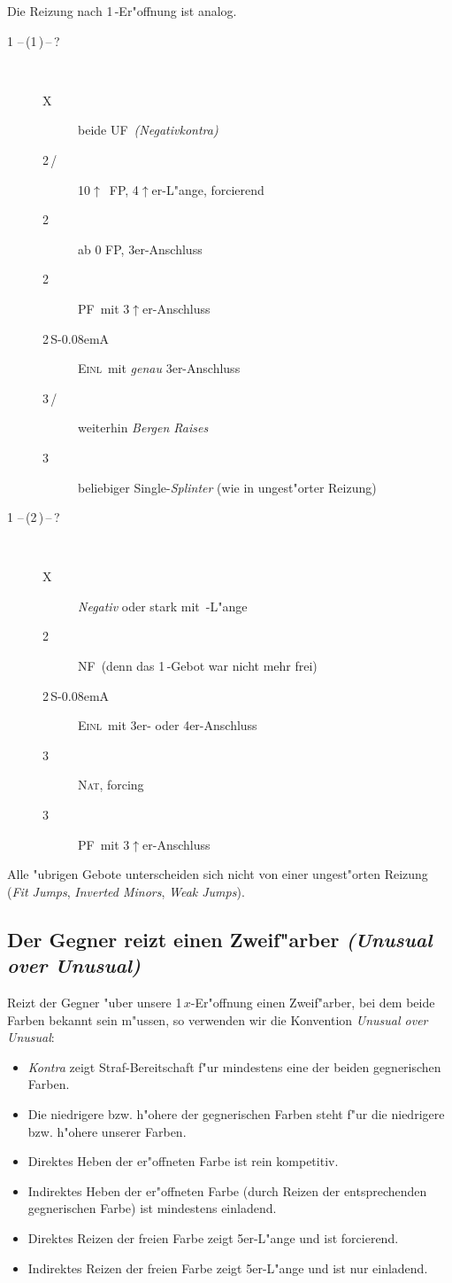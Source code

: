 \documentclass[11pt,german,twocolumn]{scrartcl}
\renewcommand{\Cl}{{\color{ClColor}{$\clubsuit$}}}
\renewcommand{\Di}{{\color{DiColor}{$\vardiamondsuit$}}}
\renewcommand{\He}{{\color{HeColor}{$\varheartsuit$}}}
\renewcommand{\Sp}{{\color{SpColor}{$\spadesuit$}}}
\def\pik{\,\Sp}
\def\coe{\,\He}
\def\kar{\,\Di}
\def\tre{\,\Cl}
\def\ka{\Di}
\def\pl{$\uparrow$}
\def\ufa{\textsf{UF}}
\def\SA{\textsf{\,S\kern-0.08emA}}
\def\kontra{\textsf{X}}
\def\sep{\,--\,}
\newcommand{\conv}[1]{\emph{#1}}
\def\nat{\textsc{Nat}}
\def\pf{\textsc{PF}}
\def\inv{\textsc{Einl}}
\def\nf{\textsc{NF}}
\def\bdsc{\begin{description}}
\def\edsc{\end{description}}
\begin{document}
Die Reizung nach 1\kar-Er"offnung ist analog.

\bdsc
\item[1\coe\sep(1\pik)\sep?]~
\bdsc
\item[\kontra] beide \ufa\ \conv{(Negativkontra)}
\item[2\tre/\ka] 10\pl\ FP, 4\pl{}er-L"ange, forcierend
\item[2\coe] ab 0 FP, 3er-Anschluss
\item[2\pik] \pf\ mit 3\pl{}er-Anschluss
\item[2\SA] \inv\ mit \emph{genau} 3er-Anschluss
\item[3\tre/\ka] weiterhin \conv{Bergen Raises}
\item[3\pik] beliebiger Single-\conv{Splinter} (wie in ungest"orter
  Reizung)
\edsc
\item[1\coe\sep(2\kar)\sep?]~
\bdsc
\item[\kontra] \conv{Negativ} oder stark mit \pik-L"ange
\item[2\pik] \nf\ (denn das 1\pik-Gebot war nicht mehr frei)
\item[2\SA] \inv\ mit 3er- oder 4er-Anschluss
\item[3\tre] \nat, forcing
\item[3\kar] \pf\ mit 3\pl{}er-Anschluss
\edsc
\edsc

Alle "ubrigen Gebote unterscheiden sich nicht von einer ungest"orten
Reizung (\conv{Fit Jumps}, \conv{Inverted Minors}, \conv{Weak Jumps}).

\subsection{Der Gegner reizt einen Zweif"arber \conv{(Unusual over
    Unusual)}}

Reizt der Gegner "uber unsere 1\,$x$-Er"offnung einen Zweif"arber, bei
dem beide Farben bekannt sein m"ussen, so verwenden wir die Konvention
\conv{Unusual over Unusual}:
\begin{itemize}
\item \conv{Kontra} zeigt Straf-Bereitschaft f"ur mindestens eine der
  beiden gegnerischen Farben.
\item Die niedrigere bzw. h"ohere der gegnerischen Farben steht
  f"ur die niedrigere bzw. h"ohere unserer Farben.
\item Direktes Heben der er"offneten Farbe ist rein kompetitiv.
\item Indirektes Heben der er"offneten Farbe (durch Reizen der
  entsprechenden gegnerischen Farbe) ist mindestens einladend.
\item Direktes Reizen der freien Farbe zeigt 5er-L"ange und ist
  forcierend.
\item Indirektes Reizen der freien Farbe zeigt 5er-L"ange und ist nur
  einladend.
\end{itemize}
\end{document}

